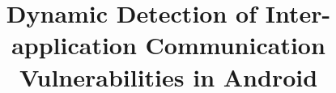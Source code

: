 \documentclass[pldi,nocopyrightspace]{sig-alternate}
\begin{document}
\title{Dynamic Detection of Inter-application Communication Vulnerabilities in Android}

\maketitle













%

%



%







\end{document}
